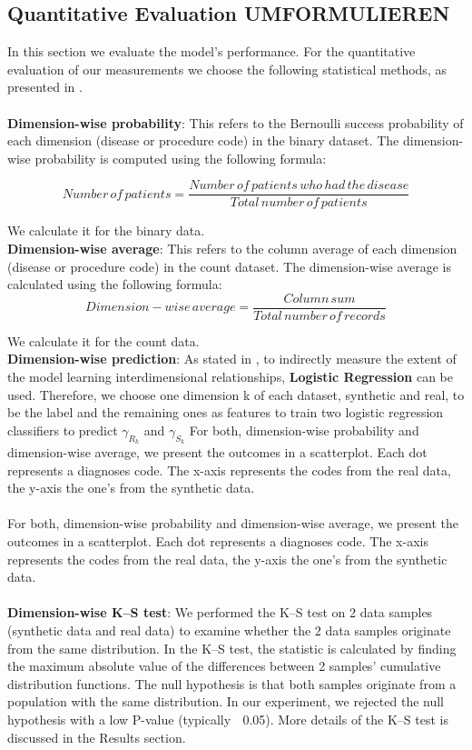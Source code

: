 \documentclass[11pt, a4paper]{book}
\begin{document}
\subsection{Quantitative Evaluation UMFORMULIEREN}
In this section we evaluate the model's performance. For the quantitative evaluation of our measurements we choose the following statistical methods, as presented in \cite{Choi2017}.
\\
\\
\textbf{Dimension-wise probability}: This refers to the Bernoulli success probability of each dimension (disease or procedure code) in the binary dataset. The dimension-wise probability is computed using the following formula: 

\begin{equation}
Number\,of\,patients = \frac{Number\,of\,patients\, who \,had \,the \,disease}{Total \,number \,of \,patients}
\end{equation}

We calculate it for the binary data.
\\

\textbf{Dimension-wise average}: This refers to the column average of each dimension (disease or procedure code) in the count dataset. The dimension-wise average is calculated using the following formula: 
\begin{equation}
Dimension-wise\,average = \frac{Column \,sum}{Total \,number \,of \,records}
\end{equation}

We calculate it for the count data.
\\

\textbf{Dimension-wise prediction}: As stated in \cite{Choi2017}, to indirectly measure the extent of the model learning interdimensional relationships, \textbf{Logistic Regression} can be used. Therefore, we choose one dimension k of each dataset, synthetic and real, to be the label and the remaining  ones as features to train two logistic regression classifiers to predict $\gamma_R_k$ and $\gamma_S_k$
For both, dimension-wise probability and dimension-wise average, we present the outcomes in a scatterplot. Each dot represents a diagnoses code. The x-axis represents the codes from the real data, the y-axis the one's from the synthetic data.
\\
\\
For both, dimension-wise probability and dimension-wise average, we present the outcomes in a scatterplot. Each dot represents a diagnoses code. The x-axis represents the codes from the real data, the y-axis the one's from the synthetic data.
\\
\\
\textbf{Dimension-wise K–S test}: We performed the K–S test on 2 data samples (synthetic data and real data) to examine whether the 2 data samples originate from the same distribution. In the K–S test, the statistic is calculated by finding the maximum absolute value of the differences between 2 samples’ cumulative distribution functions. The null hypothesis is that both samples originate from a population with the same distribution. In our experiment, we rejected the null hypothesis with a low P-value (typically 􏰆 0.05). More details of the K–S test is discussed in the Results section. 
\end{document}
